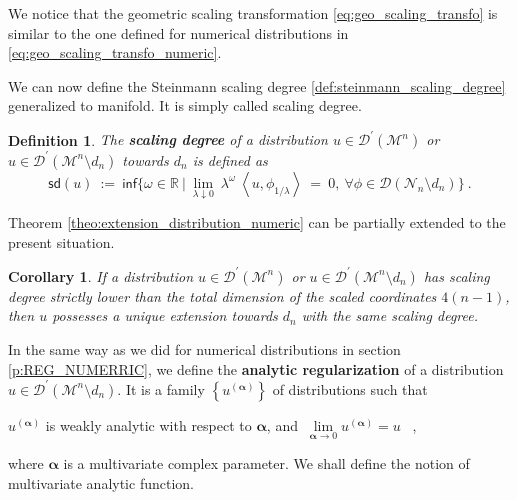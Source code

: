 \documentclass[11pt]{book}
\newcommand{\sd}{\mathsf{sd}}
\renewcommand{\inf}{\mathsf{inf}}
\newcommand{\alphabd}{\boldsymbol{\alpha}}
\newcommand{\sm}[1]{\left\langle#1\right\rangle}
\newcommand{\Dcal}{\mathcal{D}}
\newcommand{\Mcal}{\mathcal{M}}
\newcommand{\Ncal}{\mathcal{N}}
\newcommand{\Rbb}{\mathbb{R}}
\theoremstyle{break}
\newtheorem{corollary}{Corollary}[chapter]
\newtheorem{definition}{Definition}[chapter]
\begin{document}
We notice that the geometric scaling transformation \eqref{eq:geo_scaling_transfo} is similar to the one defined for numerical distributions in \eqref{eq:geo_scaling_transfo_numeric}. 


We can now define the Steinmann scaling degree \ref{def:steinmann_scaling_degree} generalized to manifold. It is simply called scaling degree.


\begin{definition}\label{def:scaling_degree}
The \textbf{scaling degree} of a distribution $u \in \Dcal^\prime(\Mcal^n)$ or $u \in \Dcal^\prime(\Mcal^n \setminus d_n)$ towards $d_n$ is defined as 
%
\begin{equation*}
\sd(u) \ := \ \inf\bigg\{ \omega \in \Rbb \ \bigg| \ \lim_{\lambda \downarrow 0} \ \lambda^\omega \ \sm{u,\phi_{1/\lambda}} \ = \ 0, \ \forall \phi\in\Dcal(\Ncal_n\setminus d_n) \bigg\} \ .
\end{equation*}
%
\end{definition}
%
Theorem \ref{theo:extension_distribution_numeric} can be partially extended to the present situation. 


\begin{corollary}\label{corol:theo_sd_M}
If a distribution $u \in\Dcal^\prime(\Mcal^n)$ or $u\in\Dcal^\prime(\Mcal^n\setminus d_n)$ has scaling degree strictly lower than the total dimension of the scaled coordinates $4(n-1)$, then $u$ possesses a unique extension towards $d_n$ with the same scaling degree. 
\end{corollary}


In the same way as we did for numerical distributions in section \ref{p:REG_NUMERRIC}, we define the \textbf{analytic regularization} of a distribution $u \in \Dcal^\prime(\Mcal^n\setminus d_n)$. It is a family $\left\{ u^{(\alphabd)}\right\}$ of distributions such that
%
\begin{center}
$u^{(\alphabd)}$ is weakly analytic with respect to $\alphabd$, and $\ \underset{\alphabd\to 0}{\lim} u^{(\alphabd)} = u$ \ ,
\end{center}
%
where $\alphabd$ is a multivariate complex parameter. We shall define the notion of multivariate analytic function.
\end{document}
